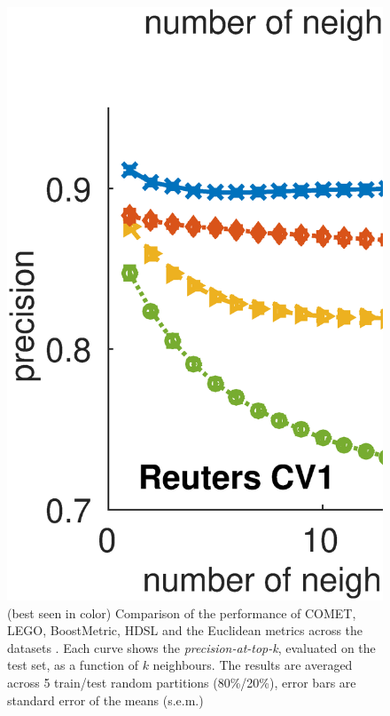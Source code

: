 \documentclass{article}
\begin{document}
{\begin{figure}[ht]
\vskip 0.2in
\begin{center}
\centerline{\includegraphics[width=\columnwidth]{Precision_at_K_all_datasets}}
\caption{ (best seen in color) Comparison of the performance of COMET, LEGO, BoostMetric, HDSL and the Euclidean metrics across the datasets . Each curve shows the \textit{precision-at-top-k}, evaluated on the test set, as a function of $k$ neighbours. The results are averaged across 5 train/test random partitions (80\%/20\%), error bars are standard error of the means (s.e.m.) }
\label{precFig}
\end{center}
\vskip -0.2in
\end{figure} 

}
\end{document}
